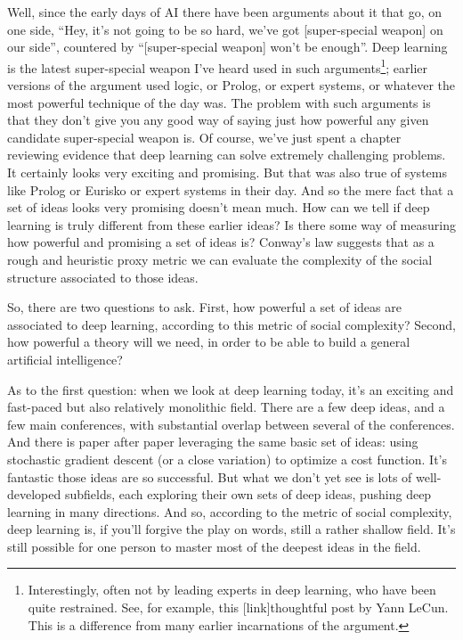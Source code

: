 \documentclass[a4paper,twoside,10pt]{book}
\begin{document}
Well, since the early days of AI there have been arguments about it that go, on one side, ``Hey, it's not going to be so hard, we've got [super-special weapon] on our side'', countered by ``[super-special weapon] won't be enough''. Deep learning is the latest super-special weapon I've heard used in such arguments\footnote{Interestingly, often not by leading experts in deep learning, who have been quite restrained. See, for example, this [link]thoughtful post by Yann LeCun. This is a difference from many earlier incarnations of the argument.}; earlier versions of the argument used logic, or Prolog, or expert systems, or whatever the most powerful technique of the day was. The problem with such arguments is that they don't give you any good way of saying just how powerful any given candidate super-special weapon is. Of course, we've just spent a chapter reviewing evidence that deep learning can solve extremely challenging problems. It certainly looks very exciting and promising. But that was also true of systems like Prolog or Eurisko or expert systems in their day. And so the mere fact that a set of ideas looks very promising doesn't mean much. How can we tell if deep learning is truly different from these earlier ideas? Is there some way of measuring how powerful and promising a set of ideas is? Conway's law suggests that as a rough and heuristic proxy metric we can evaluate the complexity of the social structure associated to those ideas.

So, there are two questions to ask. First, how powerful a set of ideas are associated to deep learning, according to this metric of social complexity? Second, how powerful a theory will we need, in order to be able to build a general artificial intelligence?

As to the first question: when we look at deep learning today, it's an exciting and fast-paced but also relatively monolithic field. There are a few deep ideas, and a few main conferences, with substantial overlap between several of the conferences. And there is paper after paper leveraging the same basic set of ideas: using stochastic gradient descent (or a close variation) to optimize a cost function. It's fantastic those ideas are so successful. But what we don't yet see is lots of well-developed subfields, each exploring their own sets of deep ideas, pushing deep learning in many directions. And so, according to the metric of social complexity, deep learning is, if you'll forgive the play on words, still a rather shallow field. It's still possible for one person to master most of the deepest ideas in the field.
\end{document}
